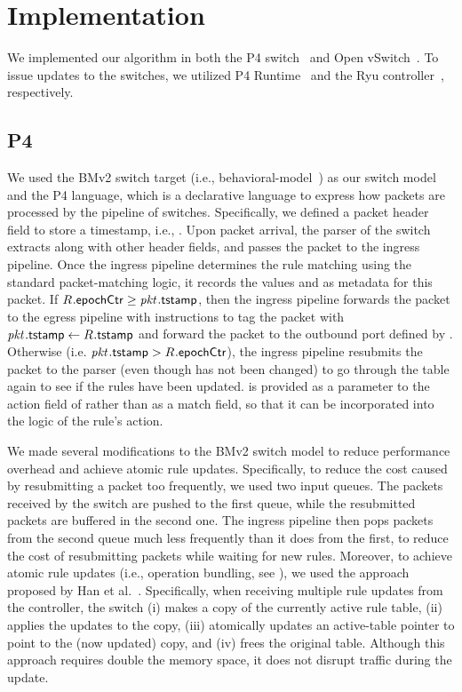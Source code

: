 \section{Implementation}
\label{sec:impl}

We implemented our algorithm in both the P4 switch~\cite{P4Switch} and
Open vSwitch~\cite{ovs}. To issue updates to the
switches, we utilized P4 Runtime~\cite{p4runtime}
and the Ryu controller~\cite{ryu},
respectively.

\subsection{P4}
\label{sec:impl:p4}

We used the BMv2 switch target (i.e., behavioral-model~\cite{bmv2}) as our switch model
and the P4 language, which is a declarative language to express how
packets are processed by the pipeline of switches. Specifically, we
defined a packet header field to store a timestamp, i.e.,
\pktID{}{\tagTmpField}. Upon packet arrival, the parser of the switch
extracts \pktID{}{\tagTmpField} along with other header fields, and
passes the packet to the ingress pipeline.  Once the ingress pipeline
determines the rule  matching \pktID{} using the standard
packet-matching logic, it records the values 
and  as metadata for this packet.  If
$\ruleID{}{\epochField} \ge \pktID{}{\tagTmpField}$, then the ingress
pipeline forwards the packet to the egress pipeline with instructions
to tag the packet with $\pktID{}{\tagTmpField} \gets
\ruleID{}{\tagTmpField}$ and forward the packet to the outbound port
defined by . Otherwise (i.e. $\pktID{}{\pktTmpField} >
\ruleID{}{\epochField}$), the ingress pipeline resubmits the packet to
the parser (even though \pktID{} has not been changed) to go through
the table again to see if the rules have been updated.
 is provided as a parameter to the action field
of  rather than as a match field, so that it can be
incorporated into the logic of the rule's action.

We made several modifications to the BMv2 switch model to reduce
performance overhead and achieve atomic rule updates. Specifically, to
reduce the cost caused by resubmitting a packet too frequently, we
used two input queues. The packets received by the switch are pushed
to the first queue, while the resubmitted packets are buffered in the
second one. The ingress pipeline then pops packets from the second
queue much less frequently than it does from the first, to reduce the
cost of resubmitting packets while waiting for new rules.  Moreover,
to achieve atomic rule updates (i.e., operation bundling, see
), we used the approach proposed by Han et
al.~\cite{Blueswitch}. Specifically, when receiving multiple rule
updates from the controller, the switch (i) makes a copy of the
currently active rule table, (ii) applies the updates to the copy,
(iii) atomically updates an active-table pointer to point to the (now
updated) copy, and (iv) frees the original table.  Although this
approach requires double the memory space, it does not disrupt traffic
during the update.

